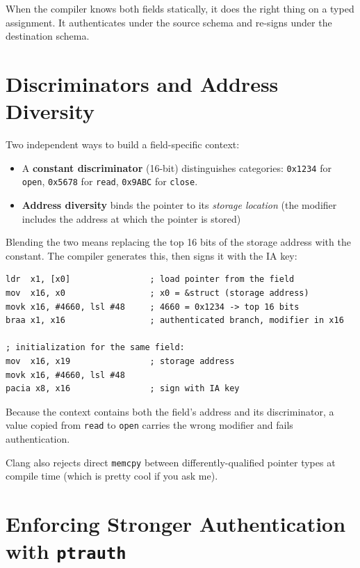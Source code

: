 When the compiler knows both fields statically, it does the right thing on a typed assignment. It authenticates under the source schema and re-signs under the destination schema.

\section{Discriminators and Address Diversity}

Two independent ways to build a field-specific context:

\begin{itemize}
\item A \textbf{constant discriminator} (16-bit) distinguishes categories: \texttt{0x1234} for \texttt{open}, \texttt{0x5678} for \texttt{read}, \texttt{0x9ABC} for \texttt{close}.
\item \textbf{Address diversity} binds the pointer to its \textit{storage location} (the modifier includes the address at which the pointer is stored)
\end{itemize}

Blending the two means replacing the top 16 bits of the storage address with the constant. The compiler generates this, then signs it with the IA key:

\begin{verbatim}
ldr  x1, [x0]                ; load pointer from the field
mov  x16, x0                 ; x0 = &struct (storage address)
movk x16, #4660, lsl #48     ; 4660 = 0x1234 -> top 16 bits
braa x1, x16                 ; authenticated branch, modifier in x16

; initialization for the same field:
mov  x16, x19                ; storage address
movk x16, #4660, lsl #48
pacia x8, x16                ; sign with IA key
\end{verbatim}

Because the context contains both the field's address and its discriminator, a value copied from \texttt{read} to \texttt{open} carries the wrong modifier and fails authentication.

Clang also rejects direct \texttt{memcpy} between differently-qualified pointer types at compile time (which is pretty cool if you ask me).

\section{Enforcing Stronger Authentication with \texttt{\uscore{}\uscore{}ptrauth}}

